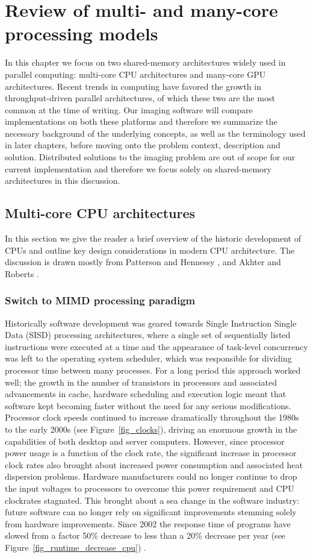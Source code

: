 \chapter{Review of multi- and many-core processing models}
\label{ch_2}
In this chapter we focus on two shared-memory architectures widely used in parallel computing: multi-core CPU architectures and many-core GPU architectures. Recent trends in computing
have favored the growth in throughput-driven parallel architectures, of which these two are the most common at the time of writing. Our imaging software will compare implementations on both these platforms and
therefore we summarize the necessary background of the underlying concepts, as well as the terminology used in later chapters, before moving onto the problem context, description and solution. Distributed 
solutions to the imaging problem are out of scope for our current implementation and therefore we focus solely on shared-memory architectures in this discussion.
\section{Multi-core CPU architectures}
In this section we give the reader a brief overview of the historic development of CPUs and outline key design considerations in modern CPU architecture. The discussion is drawn mostly from 
Patterson and Hennessy \cite[ch. 1, 4, 5 and 7]{patterson2009computer}, and Akhter and Roberts \cite[ch. 1, 3 and 6]{akhter2006multi}.
\subsection{Switch to MIMD processing paradigm}
Historically software development was geared towards Single Instruction Single Data (SISD) processing architectures, where a single set of sequentially listed instructions were 
executed at a time and the appearance of task-level concurrency was left to the operating system scheduler, which was responsible for dividing processor time between many processes. 
For a long period this approach worked well; the growth in the number of transistors in processors and associated 
advancements in cache, hardware scheduling and execution logic meant that software kept becoming faster without the need for any serious modifications. Processor clock
speeds continued to increase dramatically throughout the 1980s to the early 2000s (see Figure~\ref{fig_clocks}), driving an enormous growth in the capabilities of both
desktop and server computers. However, since processor power usage is a function of the clock rate, the significant increase in processor clock rates 
also brought about increased power consumption and associated heat dispersion problems. Hardware manufacturers could no longer continue to drop the input 
voltages to processors to overcome this power requirement and CPU clockrates stagnated. This brought about a sea change in the software industry: 
future software can no longer rely on significant improvements stemming solely from hardware improvements. Since 2002 the response time of programs have slowed 
from a factor 50\% decrease to less than a 20\% decrease per year (see Figure~\ref{fig_runtime_decrease_cpu}) \cite{patterson2009computer}.

